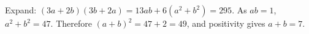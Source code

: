 Expand: $(3a+2b)(3b+2a)=13ab+6(a^2+b^2)=295$. As $ab=1$, $a^2+b^2=47$. Therefore $(a+b)^2=47+2=49$, and positivity gives $\boxed{a+b=7}$.

